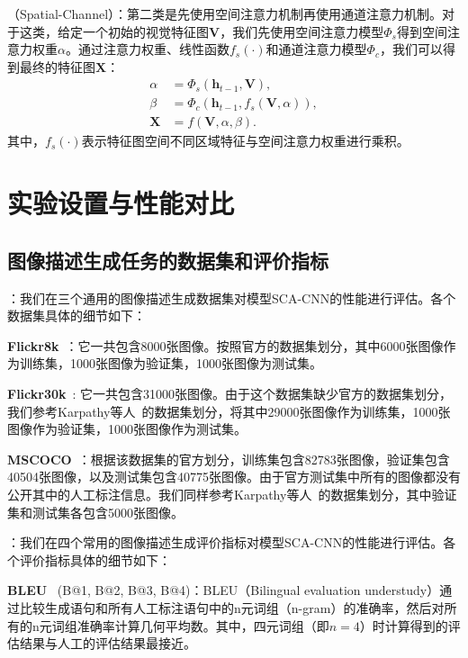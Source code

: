 \textbf{}（Spatial-Channel）：第二类是先使用空间注意力机制再使用通道注意力机制。对于这类，给定一个初始的视觉特征图$\bm{V}$，我们先使用空间注意力模型$\Phi_s$得到空间注意力权重$\alpha$。通过注意力权重、线性函数$f_s(\cdot)$和通道注意力模型$\Phi_c$，我们可以得到最终的特征图$\bm{X}$：
\begin{equation} \label{ch5:eq:eq_9}
\begin{split}
\alpha &= \Phi_s \left(\bm{h}_{t-1}, \bm{V} \right), \\
\beta &= \Phi_c \left(\bm{h}_{t-1}, f_s \left(\bm{V}, \alpha \right) \right), \\
\bm{X} &= f \left(\bm{V}, \alpha, \beta \right).
\end{split}
\end{equation}
其中，$f_s(\cdot)$表示特征图空间不同区域特征与空间注意力权重进行乘积。


\section{实验设置与性能对比}
\subsection{图像描述生成任务的数据集和评价指标}

\textbf{}：我们在三个通用的图像描述生成数据集对模型SCA-CNN的性能进行评估。各个数据集具体的细节如下：

\textbf{Flickr8k}~\cite{hodosh2013framing}：它一共包含8000张图像。按照官方的数据集划分，其中6000张图像作为训练集，1000张图像为验证集，1000张图像为测试集。

\textbf{Flickr30k}~\cite{young2014image}: 它一共包含31000张图像。由于这个数据集缺少官方的数据集划分，我们参考Karpathy等人~\cite{karpathy2015deep}的数据集划分，将其中29000张图像作为训练集，1000张图像作为验证集，1000张图像作为测试集。

\textbf{MSCOCO}~\cite{lin2014microsoft}：根据该数据集的官方划分，训练集包含82783张图像，验证集包含40504张图像，以及测试集包含40775张图像。由于官方测试集中所有的图像都没有公开其中的人工标注信息。我们同样参考Karpathy等人~\cite{karpathy2015deep}的数据集划分，其中验证集和测试集各包含5000张图像。

\textbf{}：我们在四个常用的图像描述生成评价指标对模型SCA-CNN的性能进行评估。各个评价指标具体的细节如下：

\textbf{BLEU}~\cite{papineni2002bleu} (B@1, B@2, B@3, B@4)：BLEU（Bilingual evaluation understudy）通过比较生成语句和所有人工标注语句中的n元词组（n-gram）的准确率，然后对所有的n元词组准确率计算几何平均数。其中，四元词组（即$n=4$）时计算得到的评估结果与人工的评估结果最接近。

